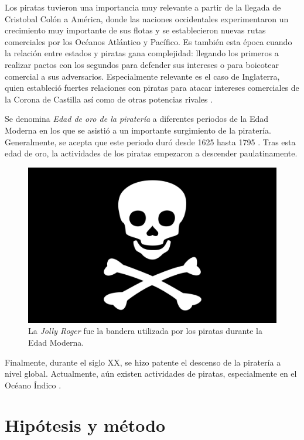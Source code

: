 \documentclass{article}
\begin{document}
Los piratas tuvieron una importancia muy relevante a partir de la llegada de Cristobal Colón a América, donde las naciones occidentales experimentaron un crecimiento muy importante de sus flotas y se establecieron nuevas rutas comerciales por los Océanos Atlántico y Pacífico. Es también esta época cuando la relación entre estados y piratas gana complejidad: llegando los primeros a realizar pactos con los segundos para defender sus intereses o para boicotear comercial a sus adversarios. Especialmente relevante es el caso de Inglaterra, quien estableció fuertes relaciones con piratas para atacar intereses comerciales de la Corona de Castilla así como de otras potencias rivales \cite{hebb2016}.

Se denomina \emph{Edad de oro de la piratería} a diferentes periodos de la Edad Moderna en los que se asistió a un importante surgimiento de la piratería. Generalmente, se acepta que este periodo duró desde 1625 hasta 1795 \cite{little2010}. Tras esta edad de oro, la actividades de los piratas empezaron a descender paulatinamente. 


\begin{figure}[h]
    \includegraphics[width=12cm]{jolly_roger.png}
    \caption{La \emph{Jolly Roger} fue la bandera utilizada por los piratas durante la Edad Moderna.}
    \centering
\end{figure}

Finalmente, durante el siglo XX, se hizo patente el descenso de la piratería a nivel global. Actualmente, aún existen actividades de piratas, especialmente en el Océano Índico \cite{gomez2013}.

\section{Hipótesis y método}
\end{document}
